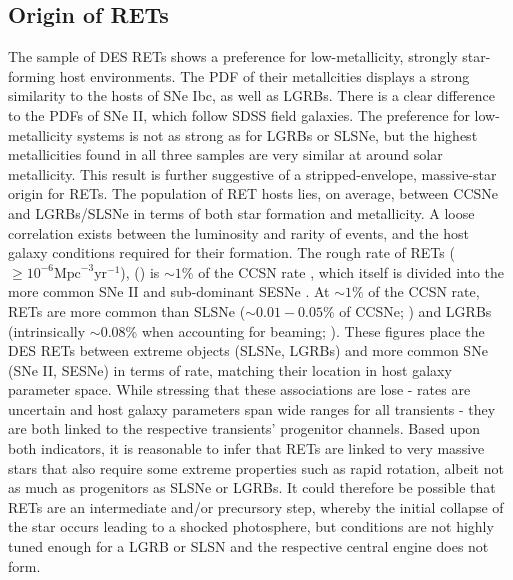 \documentclass[fleqn,usenatbib,]{mnras}
\begin{document}
\subsection{Origin of RETs}

The sample of DES RETs shows a preference for low-metallicity, strongly star-forming host environments. The PDF of their metallcities displays a strong similarity to the hosts of SNe Ibc, as well as LGRBs. There is a clear difference to the PDFs of SNe II, which follow SDSS field galaxies. The preference for low-metallicity systems is not as strong as for LGRBs or SLSNe, but the highest metallicities found in all three samples are very similar at around solar metallicity. This result is further suggestive of a stripped-envelope, massive-star origin for RETs. 
The population of RET hosts lies, on average, between CCSNe and LGRBs/SLSNe in terms of both star formation and metallicity. A loose correlation exists between the luminosity and rarity of events, and the host galaxy conditions required for their formation. The rough rate of RETs ($\geq 10^{-6} \mathrm{Mpc}^{-3} \mathrm{yr}^{-1}$), () is $\sim1\%$ of the CCSN rate \citep{Li2011,Horiuchi2011}, which itself is divided into the more common SNe II and sub-dominant SESNe \citep{Kelly2012,Frohmaier2020}. At $\sim1\%$ of the CCSN rate, RETs are more common than SLSNe ($\sim0.01 - 0.05\%$ of CCSNe; \citealt{McCrum2015,Prajz2016,Frohamier2020}) and LGRBs (intrinsically $\sim0.08\%$ when accounting for beaming; \citealt{Graham2016}). These figures place the DES RETs between extreme objects (SLSNe, LGRBs) and more common SNe (SNe II, SESNe) in terms of rate, matching their location in host galaxy parameter space. While stressing that these associations are lose - rates are uncertain and host galaxy parameters span wide ranges for all transients - they are both linked to the respective transients' progenitor channels. Based upon both indicators, it is reasonable to infer that RETs are linked to very massive stars that also require some extreme properties such as rapid rotation, albeit not as much as progenitors as SLSNe or LGRBs. It could therefore be possible that RETs are an intermediate and/or precursory step, whereby the initial collapse of the star occurs leading to a shocked photosphere, but conditions are not highly tuned enough for a LGRB or SLSN and the respective central engine does not form. 
\end{document}
